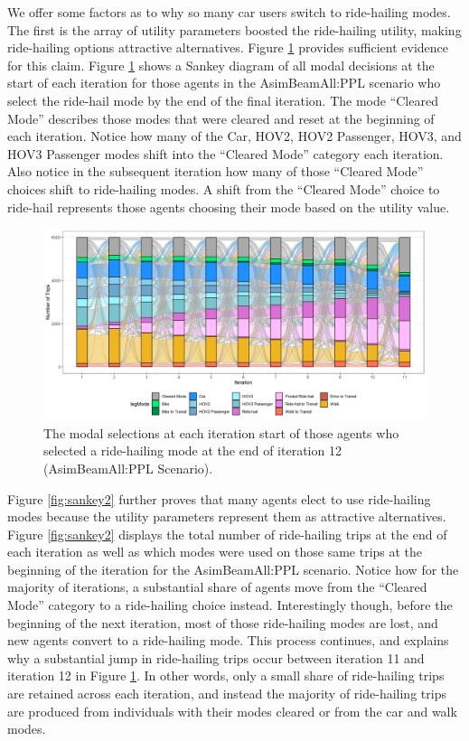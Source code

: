 \documentclass[fancy, masters]{byuthesis}
\begin{document}
We offer some factors as to why so many car users switch to ride-hailing modes. The first is the array of utility parameters boosted the ride-hailing utility, making ride-hailing options attractive alternatives. Figure \ref{fig:sankey} provides sufficient evidence for this claim. Figure \ref{fig:sankey} shows a Sankey diagram of all modal decisions at the start of each iteration for those agents in the AsimBeamAll:PPL scenario who select the ride-hail mode by the end of the final iteration. The mode ``Cleared Mode'' describes those modes that were cleared and reset at the beginning of each iteration. Notice how many of the Car, HOV2, HOV2 Passenger, HOV3, and HOV3 Passenger modes shift into the ``Cleared Mode'' category each iteration. Also notice in the subsequent iteration how many of those ``Cleared Mode'' choices shift to ride-hailing modes. A shift from the ``Cleared Mode'' choice to ride-hail represents those agents choosing their mode based on the utility value.

\begin{figure}

\centering
\includegraphics[width = 1.05\paperwidth]{planshifts.png}
\caption[Selection process of agents who switch to ride-hail.]{The modal selections at each iteration start of those agents who selected a ride-hailing mode at the end of iteration 12 (AsimBeamAll:PPL Scenario).}
\label{fig:sankey}

\end{figure}

Figure \ref{fig:sankey2} further proves that many agents elect to use ride-hailing modes because the utility parameters represent them as attractive alternatives. Figure \ref{fig:sankey2} displays the total number of ride-hailing trips at the end of each iteration as well as which modes were used on those same trips at the beginning of the iteration for the AsimBeamAll:PPL scenario. Notice how for the majority of iterations, a substantial share of agents move from the ``Cleared Mode'' category to a ride-hailing choice instead. Interestingly though, before the beginning of the next iteration, most of those ride-hailing modes are lost, and new agents convert to a ride-hailing mode. This process continues, and explains why a substantial jump in ride-hailing trips occur between iteration 11 and iteration 12 in Figure \ref{fig:sankey}. In other words, only a small share of ride-hailing trips are retained across each iteration, and instead the majority of ride-hailing trips are produced from individuals with their modes cleared or from the car and walk modes.
\end{document}

